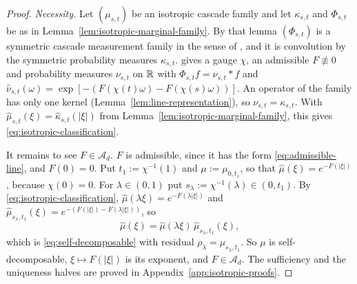 \begin{proof}
\emph{Necessity.} Let $(\mu_{s,t})$ be an isotropic cascade family and let $\kappa_{s,t}$ and
$\Phi_{s,t}$ be as in Lemma~\ref{lem:isotropic-marginal-family}. By that lemma $(\Phi_{s,t})$ is a
symmetric cascade measurement family in the sense of
, and it is convolution by the symmetric probability
measures $\kappa_{s,t}$.  gives a gauge $\chi$, an
admissible $F \not\equiv 0$ and probability measures $\nu_{s,t}$ on $\mathbb{R}$ with
$\Phi_{s,t}f = \nu_{s,t} * f$ and
$\widehat\nu_{s,t}(\omega) = \exp[-(F(\chi(t)\omega) - F(\chi(s)\omega))]$. An operator of the
family has only one kernel (Lemma~\ref{lem:line-representation}), so $\nu_{s,t} = \kappa_{s,t}$.
With $\widehat\mu_{s,t}(\xi) = \widehat\kappa_{s,t}(|\xi|)$ from
Lemma~\ref{lem:isotropic-marginal-family}, this gives \ref{eq:isotropic-classification}.

It remains to see $F \in \mathcal{A}_d$. $F$ is admissible, since it has the form
\ref{eq:admissible-line}, and $F(0) = 0$. Put $t_1 := \chi^{-1}(1)$ and $\mu := \mu_{0,t_1}$, so
that $\widehat\mu(\xi) = e^{-F(|\xi|)}$, because $\chi(0) = 0$. For $\lambda \in (0,1)$ put
$s_\lambda := \chi^{-1}(\lambda) \in (0,t_1)$. By \ref{eq:isotropic-classification},
$\widehat\mu(\lambda\xi) = e^{-F(\lambda|\xi|)}$ and
$\widehat\mu_{s_\lambda,t_1}(\xi) = e^{-(F(|\xi|) - F(\lambda|\xi|))}$, so
\[
  \widehat\mu(\xi) = \widehat\mu(\lambda\xi)\,\widehat\mu_{s_\lambda,t_1}(\xi) ,
\]
which is \ref{eq:self-decomposable} with residual $\rho_\lambda = \mu_{s_\lambda,t_1}$. So $\mu$ is
self-decomposable, $\xi \mapsto F(|\xi|)$ is its exponent, and $F \in \mathcal{A}_d$.
The sufficiency and the uniqueness halves are proved in Appendix~\ref{app:isotropic-proofs}.
\end{proof}

